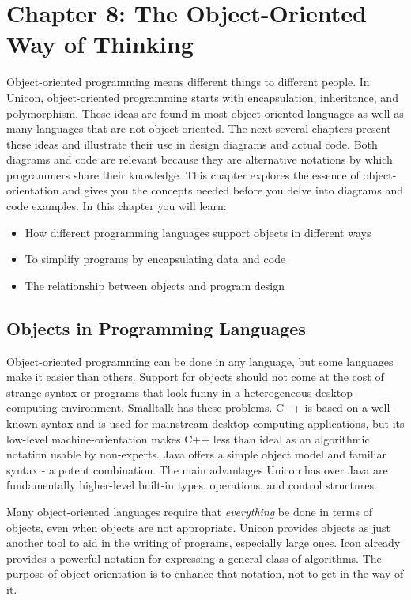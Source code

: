 \clearpage\section{Chapter 8: The Object-Oriented Way of Thinking}
Object-oriented programming means
different things to different people. In Unicon, object-oriented
programming starts with encapsulation, inheritance, and polymorphism.
These ideas are found in most object-oriented languages as well as many
languages that are not object-oriented. The next several chapters
present these ideas and illustrate their use in design diagrams and
actual code. Both diagrams and code are relevant because they are
alternative notations by which programmers share their knowledge. This
chapter explores the essence of object-orientation and gives you the
concepts needed before you delve into diagrams and code examples. In
this chapter you will learn:

\begin{itemize}
\item How different programming languages support objects in different
ways
\item To simplify programs by encapsulating data and code
\item The relationship between objects and program design
\end{itemize}
\subsection{Objects in Programming Languages}
Object-oriented programming can be done in any language, but some
languages make it easier than others. Support for objects should not
come at the cost of strange syntax or programs that look funny in a
heterogeneous desktop-computing environment. Smalltalk
has these problems. C++ is based on a well-known syntax and is used for
mainstream desktop computing applications, but its low-level
machine-orientation makes C++ less than ideal as an algorithmic
notation usable by non-experts. Java offers a simple object
model and familiar syntax - a potent combination. The main advantages
Unicon has over Java are fundamentally higher-level built-in types,
operations, and control structures.

Many object-oriented languages require that \textit{everything} be done
in terms of objects, even when objects are not appropriate. Unicon
provides objects as just another tool to aid in the writing of
programs, especially large ones. Icon already provides a powerful
notation for expressing a general class of algorithms. The purpose of
object-orientation is to enhance that notation, not to get in the way
of it.

